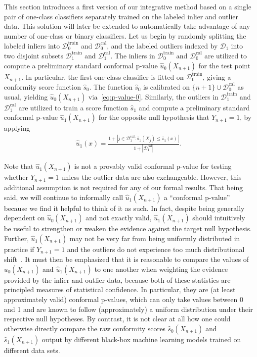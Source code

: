 \documentclass[11pt]{article}
\begin{document}
This section introduces a first version of our integrative method based on a single pair of one-class classifiers separately trained on the labeled inlier and outlier data.
This solution will later be extended to automatically take advantage of any number of one-class or binary classifiers.
Let us begin by randomly splitting the labeled inliers into $\mathcal{D}_0^{\mathrm{train}}$ and $\mathcal{D}_0^{\mathrm{cal}}$, and the labeled outliers indexed by $\mathcal{D}_1$ into two disjoint subsets $\mathcal{D}_1^{\mathrm{train}}$ and $\mathcal{D}_1^{\mathrm{cal}}$.
The inliers in $\mathcal{D}_0^{\mathrm{train}}$ and $\mathcal{D}_0^{\mathrm{cal}}$ are utilized to compute a preliminary standard conformal p-value $\hat{u}_0(X_{n+1})$ for the test point $X_{n+1}$. 
In particular, the first one-class classifier is fitted on $\mathcal{D}_0^{\mathrm{train}}$, giving a conformity score function $\hat{s}_0$.
The function $\hat{s}_0$ is calibrated on $\{n+1\} \cup \mathcal{D}_0^{\mathrm{cal}}$ as usual, yielding $\hat{u}_0(X_{n+1})$ via~\eqref{eq:p-value-0}.
Similarly, the outliers in $\mathcal{D}_1^{\mathrm{train}}$ and $\mathcal{D}_1^{\mathrm{cal}}$ are utilized to train a score function $\hat{s}_1$ and compute a preliminary standard conformal p-value $\hat{u}_1(X_{n+1})$ for the opposite null hypothesis that $Y_{n+1}=1$, by applying
\begin{align} \label{eq:p-value-1}
  \hat{u}_1(x) = \frac{1 + |j \in \mathcal{D}_{1}^{\mathrm{cal}} : \hat{s}_1(X_j) \leq  \hat{s}_1(x)|}{1+|\mathcal{D}_{1}^{\mathrm{cal}}|}.
\end{align}

Note that $\hat{u}_1(X_{n+1})$ is not a provably valid conformal p-value for testing whether $Y_{n+1}=1$ unless the outlier data are also exchangeable.
However, this additional assumption is not required for any of our formal results. That being said, we will continue to informally call $\hat{u}_1(X_{n+1})$ a ``conformal p-value'' because we find it helpful to think of it as such.
In fact, despite being generally dependent on $\hat{u}_0(X_{n+1})$ and not exactly valid, $\hat{u}_1(X_{n+1})$ should intuitively be useful to strengthen or weaken the evidence against the target null hypothesis. Further, $\hat{u}_1(X_{n+1})$ may not be very far from being uniformly distributed in practice if $Y_{n+1}=1$ and the outliers do not experience too much distributional shift~\cite{tibshirani2019conformal}.
It must then be emphasized that it is reasonable to compare the values of $\hat{u}_0(X_{n+1})$ and $\hat{u}_1(X_{n+1})$ to one another when weighting the evidence provided by the inlier and outlier data, because both of these statistics are principled measures of statistical confidence. In particular, they are (at least approximately valid) conformal p-values, which can only take values between 0 and 1 and are known to follow (approximately) a uniform distribution under their respective null hypotheses. By contrast, it is not clear at all how one could otherwise directly compare the raw conformity scores $\hat{s}_0(X_{n+1})$ and $\hat{s}_1(X_{n+1})$ output by different black-box machine learning models trained on different data sets.
\end{document}
